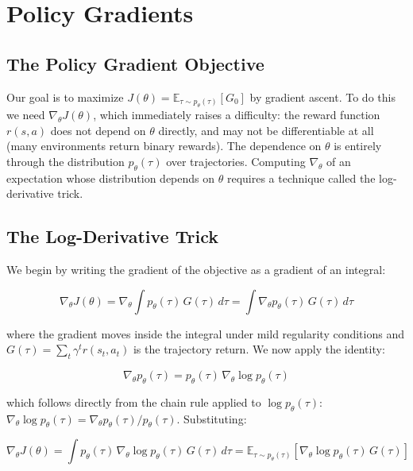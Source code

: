 \documentclass{book}
\begin{document}
\section{Policy Gradients}
\label{sec:policy_gradients}

\subsection{The Policy Gradient Objective}
\label{sec:pg_objective}

Our goal is to maximize $J(\theta) = \mathbb{E}_{\tau \sim p_\theta(\tau)}
[G_0]$ by gradient ascent. To do this we need $\nabla_\theta J(\theta)$,
which immediately raises a difficulty: the reward function $r(s, a)$ does
not depend on $\theta$ directly, and may not be differentiable at all
(many environments return binary rewards). The dependence on $\theta$ is
entirely through the distribution $p_\theta(\tau)$ over trajectories.
Computing $\nabla_\theta$ of an expectation whose distribution depends on
$\theta$ requires a technique called the log-derivative trick.

\subsection{The Log-Derivative Trick}
\label{sec:log_derivative}

We begin by writing the gradient of the objective as a gradient of an
integral:

\begin{equation}
\label{eq:grad_integral}
\nabla_\theta J(\theta)
= \nabla_\theta \int p_\theta(\tau)\, G(\tau)\, d\tau
= \int \nabla_\theta p_\theta(\tau)\, G(\tau)\, d\tau
\end{equation}

where the gradient moves inside the integral under mild regularity
conditions and $G(\tau) = \sum_t \gamma^t r(s_t, a_t)$ is the trajectory
return. We now apply the identity:

\begin{equation}
\label{eq:log_trick_identity}
\nabla_\theta p_\theta(\tau)
= p_\theta(\tau)\, \nabla_\theta \log p_\theta(\tau)
\end{equation}

which follows directly from the chain rule applied to $\log p_\theta(\tau)$:
$\nabla_\theta \log p_\theta(\tau) = \nabla_\theta p_\theta(\tau) /
p_\theta(\tau)$. Substituting:

\begin{equation}
\label{eq:grad_expectation}
\nabla_\theta J(\theta)
= \int p_\theta(\tau)\, \nabla_\theta \log p_\theta(\tau)\, G(\tau)\, d\tau
= \mathbb{E}_{\tau \sim p_\theta(\tau)}\!\left[
    \nabla_\theta \log p_\theta(\tau)\, G(\tau) \right]
\end{equation}
\end{document}
